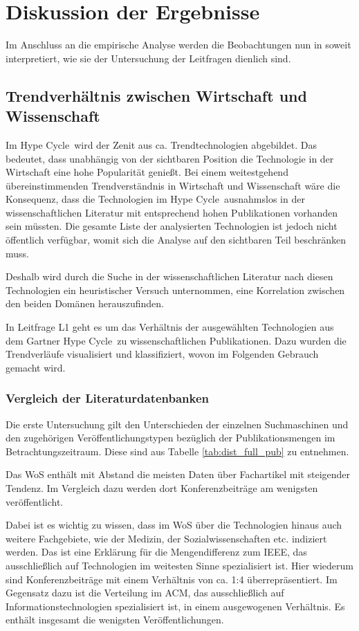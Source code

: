 \section{Diskussion der Ergebnisse}
Im Anschluss an die empirische Analyse werden die Beobachtungen nun in soweit interpretiert, wie sie der Untersuchung der Leitfragen dienlich sind.

\subsection{Trendverhältnis zwischen Wirtschaft und Wissenschaft}
Im \glqq Hype Cycle\grqq~wird der Zenit aus ca.  Trendtechnologien abgebildet. Das bedeutet, dass unabhängig von der sichtbaren Position die Technologie in der Wirtschaft eine hohe Popularität genießt. Bei einem weitestgehend übereinstimmenden Trendverständnis in Wirtschaft und Wissenschaft wäre die Konsequenz, dass die Technologien im \glqq Hype Cycle\grqq~ausnahmslos in der wissenschaftlichen Literatur mit entsprechend hohen Publikationen vorhanden sein müssten. Die gesamte Liste der analysierten Technologien ist jedoch nicht öffentlich verfügbar, womit sich die Analyse auf den sichtbaren Teil beschränken muss.

Deshalb wird durch die Suche in der wissenschaftlichen Literatur nach diesen Technologien ein heuristischer Versuch unternommen, eine Korrelation zwischen den beiden Domänen herauszufinden.

In Leitfrage L1 geht es um das Verhältnis der ausgewählten Technologien aus dem \glqq Gartner Hype Cycle\grqq~zu wissenschaftlichen Publikationen. Dazu wurden die Trendverläufe visualisiert und klassifiziert, wovon im Folgenden Gebrauch gemacht wird.

\subsubsection{Vergleich der Literaturdatenbanken}
Die erste Untersuchung gilt den Unterschieden der einzelnen Suchmaschinen und den zugehörigen Veröffentlichungstypen bezüglich der Publikationsmengen im Betrachtungszeitraum. Diese sind aus Tabelle \ref{tab:dist_full_pub} zu entnehmen.

Das \ac{WoS} enthält mit Abstand die meisten Daten über Fachartikel mit steigender Tendenz. Im Vergleich dazu werden dort Konferenzbeiträge am wenigsten veröffentlicht.

Dabei ist es wichtig zu wissen, dass im \ac{WoS} über die Technologien hinaus auch weitere Fachgebiete, wie der Medizin, der Sozialwissenschaften etc. indiziert werden. Das ist eine Erklärung für die Mengendifferenz zum \ac{IEEE}, das ausschließlich auf Technologien im weitesten Sinne spezialisiert ist. Hier wiederum sind Konferenzbeiträge mit einem Verhältnis von ca. 1:4 überrepräsentiert. Im Gegensatz dazu ist die Verteilung im \ac{ACM}, das ausschließlich auf Informationstechnologien spezialisiert ist, in einem ausgewogenen Verhältnis. Es enthält insgesamt die wenigsten Veröffentlichungen.

